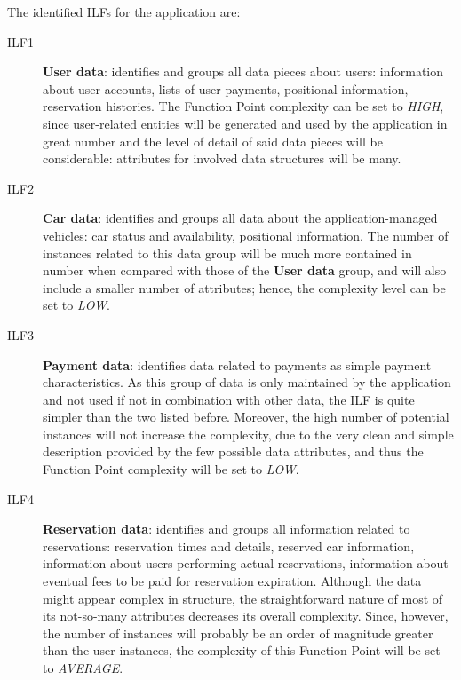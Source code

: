The identified ILFs for the application are:
\begin{description}
\item[ILF1] \textbf{User data}: identifies and groups all data pieces about users: information about user accounts, lists of user payments, positional information, reservation histories. The Function Point complexity can be set to \textit{HIGH}, since user-related entities will be generated and used by the application in great number and the level of detail of said data pieces will be considerable: attributes for involved data structures will be many.
\item[ILF2] \textbf{Car data}:	identifies and groups all data about the application-managed vehicles: car status and availability, positional information. The number of instances related to this data group will be much more contained in number when compared with those of the \textbf{User data} group, and will also include a smaller number of attributes; hence, the complexity level can be set to \textit{LOW}.
\item[ILF3] \textbf{Payment data}: identifies data related to payments as simple payment characteristics. As this group of data is only maintained by the application and not used if not in combination with other data, the ILF is quite simpler than the two listed before. Moreover, the high number of potential instances will not increase the complexity, due to the very clean and simple description provided by the few possible data attributes, and thus the Function Point complexity will be set to \textit{LOW}.
\item[ILF4] \textbf{Reservation data}: identifies and groups all information related to reservations: reservation times and details, reserved car information, information about users performing actual reservations, information about eventual fees to be paid for reservation expiration. Although the data might appear complex in structure, the straightforward nature of most of its not-so-many attributes decreases its overall complexity. Since, however, the number of instances will probably be an order of magnitude greater than the user instances, the complexity of this Function Point will be set to \textit{AVERAGE}.

\end{description}

